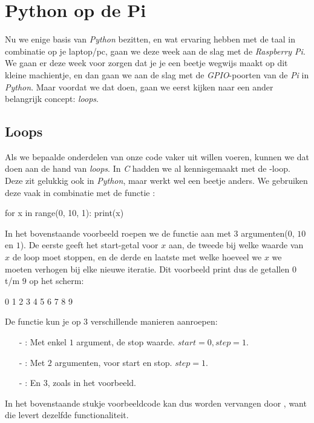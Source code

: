 \chapter{Python op de Pi}

Nu we enige basis van \textit{Python} bezitten, en wat ervaring hebben met de taal in combinatie op je laptop/pc, gaan we deze week aan de slag met de \textit{Raspberry Pi}. We gaan er deze week voor zorgen dat je je een beetje wegwijs maakt op dit kleine machientje, en dan gaan we aan de slag met de \textit{GPIO}-poorten van de \textit{Pi} in \textit{Python}. Maar voordat we dat doen, gaan we eerst kijken naar een ander belangrijk concept: \textit{loops}. 

\section{Loops}
Als we bepaalde onderdelen van onze code vaker uit willen voeren, kunnen we dat doen aan de hand van \textit{loops}. In \textit{C} hadden we al kennisgemaakt met de -loop. Deze zit gelukkig ook in \textit{Python}, maar werkt wel een beetje anders. We gebruiken deze vaak in combinatie met de functie :
\begin{python}
for x in range(0, 10, 1):
	print(x)
\end{python}
In het bovenstaande voorbeeld roepen we de functie  aan met 3 argumenten($0$, $10$ en $1$). De eerste geeft het start-getal voor $x$ aan, de tweede bij welke waarde van $x$ de loop moet stoppen, en de derde en laatste met welke hoeveel we $x$ we moeten verhogen bij elke nieuwe iteratie. Dit voorbeeld print dus de getallen $0$ t/m $9$ op het scherm:
\begin{python}
0
1
2
3
4
5
6
7
8
9
\end{python}

\begin{remark}
De functie  kun je op $3$ verschillende manieren aanroepen:
\begin{enumerate}
\item[-] : Met enkel $1$ argument, de stop waarde. $start=0, step=1$.
\item[-] : Met $2$ argumenten, voor start en stop. $step=1$.
\item[-] : En $3$, zoals in het voorbeeld.
\end{enumerate}
In het bovenstaande stukje voorbeeldcode kan dus  worden vervangen door , want die levert dezelfde functionaliteit.
\end{remark}


